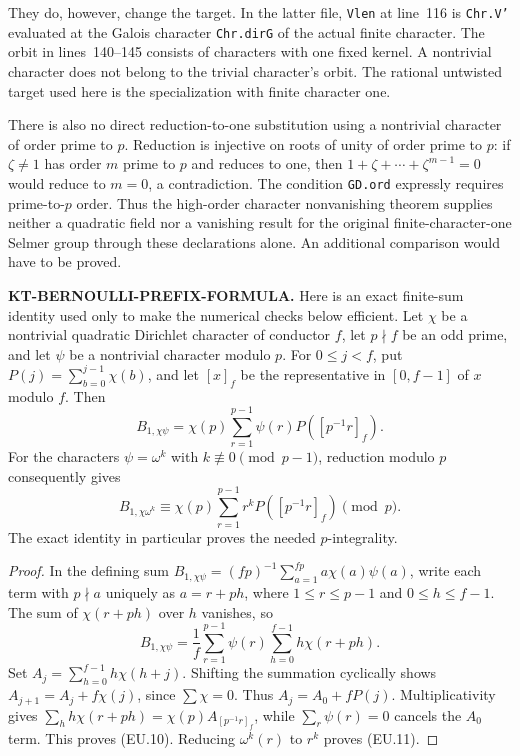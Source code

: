 \documentclass[11pt,a4paper]{article}
\theoremstyle{definition}
\renewcommand{\paragraph}[1]{\par\smallskip\noindent\textbf{#1}\quad\ignorespaces}
\begin{document}
They do, however, change the target. In the latter file,
\texttt{Vlen} at line~116 is
\texttt{Chr.V'} evaluated at the Galois character
\texttt{Chr.dirG} of the actual finite character. The orbit in
lines~140--145 consists of characters with one fixed kernel.
A nontrivial character does not belong to the trivial character's
orbit. The rational untwisted target used here is the
specialization with finite character one.

There is also no direct reduction-to-one substitution using a
nontrivial character of order prime to $p$. Reduction is injective
on roots of unity of order prime to $p$: if $\zeta\ne1$ has
order $m$ prime to $p$ and reduces to one, then
$1+\zeta+\cdots+\zeta^{m-1}=0$ would reduce to $m=0$,
a contradiction. The condition \texttt{GD.ord} expressly
requires prime-to-$p$ order. Thus the high-order character
nonvanishing theorem supplies neither a quadratic field nor a
vanishing result for the original finite-character-one Selmer
group through these declarations alone. An additional comparison
would have to be proved.



\paragraph{KT-BERNOULLI-PREFIX-FORMULA.}
Here is an exact finite-sum identity used only to make the numerical
checks below efficient.  Let $\chi$ be a nontrivial quadratic Dirichlet
character of conductor $f$, let $p\nmid f$ be an odd prime, and let
$\psi$ be a nontrivial character modulo $p$.  For $0\leq j<f$, put
$P(j)=\sum_{b=0}^{j-1}\chi(b)$, and let $[x]_f$ be the representative
in $[0,f-1]$ of $x$ modulo $f$.  Then
\[
 B_{1,\chi\psi}
   =\chi(p)\sum_{r=1}^{p-1}\psi(r)P([p^{-1}r]_f).          \tag{EU.10}
\]
For the characters $\psi=\omega^k$ with
$k\not\equiv0\pmod{p-1}$, reduction modulo $p$ consequently gives
\[
 B_{1,\chi\omega^k}
 \equiv\chi(p)\sum_{r=1}^{p-1}r^kP([p^{-1}r]_f)\pmod p.  \tag{EU.11}
\]
The exact identity in particular proves the needed $p$-integrality.

\begin{proof}
In the defining sum
$B_{1,\chi\psi}=(fp)^{-1}\sum_{a=1}^{fp}a\chi(a)\psi(a)$,
write each term with $p\nmid a$ uniquely as $a=r+ph$, where
$1\leq r\leq p-1$ and $0\leq h\leq f-1$.  The sum of
$\chi(r+ph)$ over $h$ vanishes, so
\[
 B_{1,\chi\psi}=\frac1f\sum_{r=1}^{p-1}\psi(r)
                       \sum_{h=0}^{f-1}h\chi(r+ph).
\]
Set $A_j=\sum_{h=0}^{f-1}h\chi(h+j)$.  Shifting the summation
cyclically shows $A_{j+1}=A_j+f\chi(j)$, since $\sum\chi=0$.
Thus $A_j=A_0+fP(j)$.  Multiplicativity gives
$\sum_hh\chi(r+ph)=\chi(p)A_{[p^{-1}r]_f}$, while
$\sum_r\psi(r)=0$ cancels the $A_0$ term.  This proves (EU.10).
Reducing $\omega^k(r)$ to $r^k$ proves (EU.11).
\end{proof}
\end{document}
